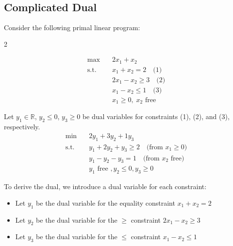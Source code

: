 \subsection*{Complicated Dual}
\label{example:complicated-dual}
Consider the following primal linear program:
\begin{multicols}{2}
\begin{tcolorbox}[title=Primal (P), colback=blue!5, colframe=blue!60!black, sharp corners=south]
\[
\begin{aligned}
\max\quad & 2x_1 + x_2 \\
\text{s.t.} \quad
& x_1 + x_2 = 2 \quad \text{(1)} \\
& 2x_1 - x_2 \geq 3 \quad \text{(2)} \\
& x_1 - x_2 \leq 1 \quad \text{(3)} \\
& x_1 \geq 0, \; x_2 \text{ free}
\end{aligned}
\]
\end{tcolorbox}

\columnbreak

\begin{tcolorbox}[title=Dual (D), colback=green!5, colframe=green!60!black, sharp corners=south]
Let \( y_1 \in \mathbb{R} \), \( y_2 \leq 0 \), \( y_3 \geq 0 \) be dual variables for constraints (1), (2), and (3), respectively.
\[
\begin{aligned}
\min\quad & 2y_1 + 3y_2 + 1y_3 \\
\text{s.t.} \quad
& y_1 + 2y_2 + y_3 \geq 2 \quad \text{(from } x_1 \geq 0\text{)} \\
& y_1 - y_2 - y_3 = 1 \quad \text{(from } x_2 \text{ free)}\\
& y_1  \text{ free } , y_2 \leq 0 , y_3 \geq 0
\end{aligned}
\]
\end{tcolorbox}
\end{multicols}

To derive the dual, we introduce a dual variable for each constraint:
\begin{itemize}
    \item Let \( y_1 \) be the dual variable for the equality constraint \( x_1 + x_2 = 2 \)
    \item Let \( y_2 \) be the dual variable for the \( \geq \) constraint \( 2x_1 - x_2 \geq 3 \)
    \item Let \( y_3 \) be the dual variable for the \( \leq \) constraint \( x_1 - x_2 \leq 1 \)
\end{itemize}


